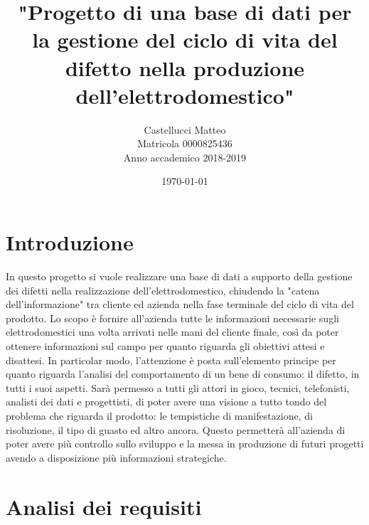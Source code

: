 \documentclass[a4paper, 12pt]{report}
\title{"Progetto di una base di dati per la gestione del ciclo di vita del difetto nella produzione dell'elettrodomestico"}
\author{Castellucci Matteo\\Matricola 0000825436\\Anno accademico 2018-2019}
\date{\today}
\begin{document}
\maketitle

\tableofcontents

\chapter{Introduzione}
In questo progetto si vuole realizzare una base di dati a supporto della gestione dei difetti nella realizzazione dell'elettrodomestico,
chiudendo la "catena dell'informazione" tra cliente ed azienda nella fase terminale del ciclo di vita del prodotto. Lo scopo è fornire
all'azienda tutte le informazioni necessarie sugli elettrodomestici una volta arrivati nelle mani del cliente finale, così da poter
ottenere informazioni sul campo per quanto riguarda gli obiettivi attesi e disattesi. In particolar modo, l'attenzione è posta sull'elemento
principe per quanto riguarda l'analisi del comportamento di un bene di consumo: il difetto, in tutti i suoi aspetti. Sarà permesso a tutti gli
attori in gioco, tecnici, telefonisti, analisti dei dati e progettisti, di poter avere una visione a tutto tondo del problema che riguarda
il prodotto: le tempistiche di manifestazione, di risoluzione, il tipo di guasto ed altro ancora. Questo permetterà all'azienda di poter
avere più controllo sullo sviluppo e la messa in produzione di futuri progetti avendo a disposizione più informazioni strategiche.

\chapter{Analisi dei requisiti}
\end{document}
